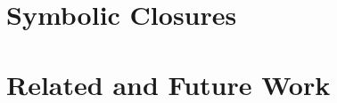 \documentclass{book}
\begin{document}
\part{%
Symbolic Closures}
\label{part:symbolic-closures}



\part{Related and Future Work}
\label{part:related-future-work}






%
%
%
\end{document}

